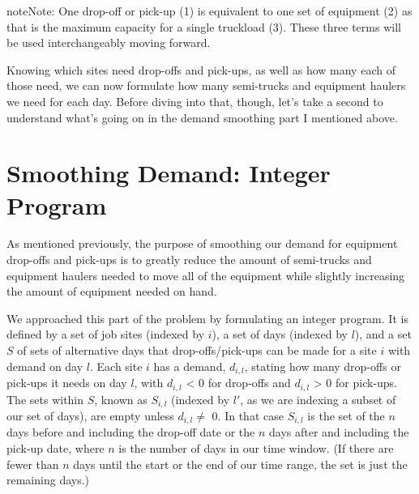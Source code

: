 \documentclass[letterpaper,10pt,english]{sphinxmanual}
\begin{document}
\begin{sphinxadmonition}{note}{Note:}
One drop-off or pick-up (1) is equivalent to one set of equipment (2) as
that is the maximum capacity for a single truckload (3). These three
terms will be used interchangeably moving forward.
\end{sphinxadmonition}

Knowing which sites need drop-offs and pick-ups, as well as how many each
of those need, we can now formulate how many semi-trucks and equipment
haulers we need for each day. Before diving into that, though, let's take a
second to understand what's going on in the demand smoothing part I mentioned
above.


\section{Smoothing Demand: Integer Program}
\label{\detokenize{variation:smoothing-demand-integer-program}}
As mentioned previously, the purpose of smoothing our demand for
equipment drop-offs and pick-ups is to greatly reduce the amount of
semi-trucks and equipment haulers needed to move all of the equipment while
slightly increasing the amount of equipment needed on hand.

We approached
this part of the problem by formulating an integer program. It is defined by
a set of job sites (indexed by \(i\)), a set of days (indexed by
\(l\)), and a set \(S\) of sets of alternative days that
drop-offs/pick-ups can be made for a site \(i\) with demand on day
\(l\). Each site \(i\) has a demand, \(d_{i,l}\), stating how
many drop-offs or pick-ups it needs on day \(l\), with \(d_{i,l}\) \textless{}
0 for drop-offs and \(d_{i,l}\) \textgreater{} 0 for pick-ups. The sets within
\(S\), known as \(S_{i,l}\) (indexed by \(l'\), as we are
indexing a subset of our set of days), are empty unless \(d_{i,l} \neq\)
0. In that case \(S_{i,l}\) is the set of the \(n\) days before and
including the drop-off date or the \(n\) days after and including the
pick-up date, where \(n\) is the number of days in our time window. (If
there are fewer than \(n\) days until the start or the end of our time
range, the set is just the remaining days.)
\end{document}
